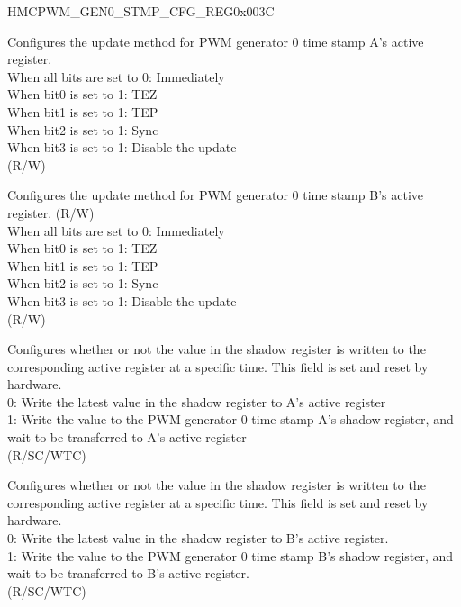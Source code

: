\begin{register}{H}{MCPWM\_GEN0\_STMP\_CFG\_REG}{0x003C}\label{regdesc:MCPWMGEN0STMPCFGREG}
%
%
%
%
%
\regnewline%
\begin{regdesc}\begin{reglist}
\label{fielddesc:MCPWMGEN0AUPMETHOD}\item [MCPWM\_GEN0\_A\_UPMETHOD] Configures the update method for PWM generator 0 time stamp A's active register.
\\When all bits are set to 0: Immediately
\\When bit0 is set to 1: TEZ
\\When bit1 is set to 1: TEP
\\When bit2 is set to 1: Sync
\\When bit3 is set to 1: Disable the update
\\(R/W)
\label{fielddesc:MCPWMGEN0BUPMETHOD}\item [MCPWM\_GEN0\_B\_UPMETHOD] Configures the update method for PWM generator 0 time stamp B's active register. (R/W)
\\When all bits are set to 0: Immediately
\\When bit0 is set to 1: TEZ
\\When bit1 is set to 1: TEP
\\When bit2 is set to 1: Sync
\\When bit3 is set to 1: Disable the update
\\(R/W)
\label{fielddesc:MCPWMGEN0ASHDWFULL}\item [MCPWM\_GEN0\_A\_SHDW\_FULL] Configures whether or not the value in the shadow register is written to the corresponding active register at a specific time. This field is set and reset by hardware. \\
0: Write the latest value in the shadow register to A's active register \\
1: Write the value to the PWM generator 0 time stamp A's shadow register, and wait to be transferred to A's active register \\
(R/SC/WTC)
\label{fielddesc:MCPWMGEN0BSHDWFULL}\item [MCPWM\_GEN0\_B\_SHDW\_FULL] Configures whether or not the value in the shadow register is written to the corresponding active register at a specific time. This field is set and reset by hardware. \\
0: Write the latest value in the shadow register to B's active register. \\
1: Write the value to the PWM generator 0 time stamp B's shadow register, and wait to be transferred to B's active register. \\
(R/SC/WTC)
\end{reglist}\end{regdesc}
\end{register}


